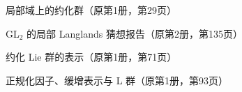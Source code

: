 \begin{description}[leftmargin=0pt,labelsep=0pt,style=nextline]
\item[\textsf{Tits, J.}]
局部域上的约化群\quad\dotfill\quad\pageref{article-02}（原第1册，第29页）\par
\item[\textsf{Tunnell, J.}]
GL$_2$ 的局部 Langlands 猜想报告\quad\dotfill\quad\pageref{article-28}（原第2册，第135页）\par
\item[\textsf{Wallach, Nolan R.}]
约化 Lie 群的表示\quad\dotfill\quad\pageref{article-03}（原第1册，第71页）\par
\item[\textsf{Zuckerman, Gregg}]
正规化因子、缓增表示与 L 群\quad\dotfill\quad\pageref{article-05}（原第1册，第93页）\par
\end{description}
